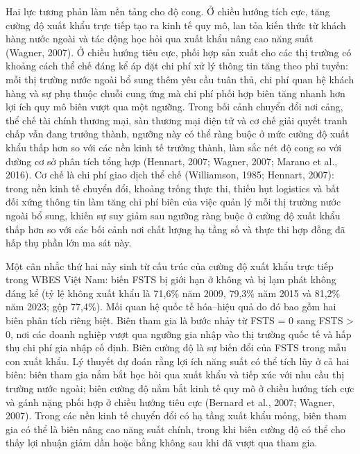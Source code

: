 \documentclass[12pt,a4paper]{article}
\begin{document}
Hai lực tương phản làm nền tảng cho độ cong. Ở chiều hướng tích cực,
tăng cường độ xuất khẩu trực tiếp tạo ra kinh tế quy mô, lan tỏa kiến
thức từ khách hàng nước ngoài và tác động học hỏi qua xuất khẩu nâng cao
năng suất (Wagner, 2007). Ở chiều hướng tiêu cực, phối hợp sản xuất cho
các thị trường có khoảng cách thể chế đáng kể áp đặt chi phí xử lý thông
tin tăng theo phi tuyến: mỗi thị trường nước ngoài bổ sung thêm yêu cầu
tuân thủ, chi phí quan hệ khách hàng và sự phụ thuộc chuỗi cung ứng mà
chi phí phối hợp biên tăng nhanh hơn lợi ích quy mô biên vượt qua một
ngưỡng. Trong bối cảnh chuyển đổi nơi cảng, thể chế tài chính thương
mại, sàn thương mại điện tử và cơ chế giải quyết tranh chấp vẫn đang
trưởng thành, ngưỡng này có thể ràng buộc ở mức cường độ xuất khẩu thấp
hơn so với các nền kinh tế trưởng thành, làm sắc nét độ cong so với
đường cơ sở phân tích tổng hợp (Hennart, 2007; Wagner, 2007; Marano et
al., 2016). Cơ chế là chi phí giao dịch thể chế (Williamson, 1985;
Hennart, 2007): trong nền kinh tế chuyển đổi, khoảng trống thực thi,
thiếu hụt logistics và bất đối xứng thông tin làm tăng chi phí biên của
việc quản lý mỗi thị trường nước ngoài bổ sung, khiến sự suy giảm sau
ngưỡng ràng buộc ở cường độ xuất khẩu thấp hơn so với các bối cảnh nơi
chất lượng hạ tầng số và thực thi hợp đồng đã hấp thụ phần lớn ma sát
này.

Một cân nhắc thứ hai nảy sinh từ cấu trúc của cường độ xuất khẩu trực
tiếp trong WBES Việt Nam: biến FSTS bị giới hạn ở không và bị lạm phát
không đáng kể (tỷ lệ không xuất khẩu là 71,6\% năm 2009, 79,3\% năm 2015
và 81,2\% năm 2023; gộp 77,4\%). Mối quan hệ quốc tế hóa--hiệu quả do đó
bao gồm hai biên phân tích riêng biệt. Biên tham gia là bước nhảy từ
FSTS = 0 sang FSTS \textgreater{} 0, nơi các doanh nghiệp vượt qua
ngưỡng gia nhập vào thị trường quốc tế và hấp thụ chi phí gia nhập cố
định. Biên cường độ là sự biến đổi của FSTS trong mẫu con xuất khẩu. Lý
thuyết dự đoán rằng lợi ích năng suất có thể tích lũy ở cả hai biên:
biên tham gia nắm bắt học hỏi qua xuất khẩu và tiếp xúc với nhu cầu thị
trường nước ngoài; biên cường độ nắm bắt kinh tế quy mô ở chiều hướng
tích cực và gánh nặng phối hợp ở chiều hướng tiêu cực (Bernard et al.,
2007; Wagner, 2007). Trong các nền kinh tế chuyển đổi có hạ tầng xuất
khẩu mỏng, biên tham gia có thể là biên nâng cao năng suất chính, trong
khi biên cường độ có thể cho thấy lợi nhuận giảm dần hoặc bằng không sau
khi đã vượt qua tham gia.
\end{document}
